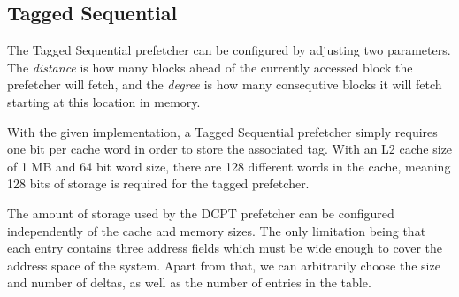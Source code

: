\subsection{Tagged Sequential}

The Tagged Sequential prefetcher can be configured by adjusting two parameters.
The \emph{distance} is how many blocks ahead of the currently accessed block the
prefetcher will fetch, and the \emph{degree} is how many consequtive blocks it will
fetch starting at this location in memory.

With the given implementation, a Tagged Sequential prefetcher simply requires
one bit per cache word in order to store the associated tag. With an L2 cache
size of 1 MB and 64 bit word size, there are 128 different words in the cache,
meaning 128 bits of storage is required for the tagged prefetcher.

The amount of storage used by the DCPT prefetcher can be configured
independently of the cache and memory sizes. The only limitation being that each
entry contains three address fields which must be wide enough to cover the
address space of the system. Apart from that, we can arbitrarily choose the size
and number of deltas, as well as the number of entries in the table.

